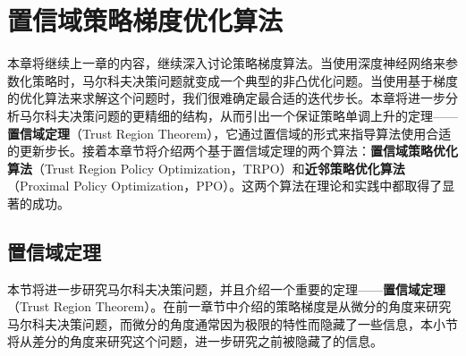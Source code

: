 \section{置信域策略梯度优化算法}

本章将继续上一章的内容，继续深入讨论策略梯度算法。当使用深度神经网络来参数化策略时，马尔科夫决策问题就变成一个典型的非凸优化问题。当使用基于梯度的优化算法来求解这个问题时，我们很难确定最合适的迭代步长。本章将进一步分析马尔科夫决策问题的更精细的结构，从而引出一个保证策略单调上升的定理——\textbf{置信域定理}\cite{kakade2002approximately}（Trust Region Theorem），它通过置信域的形式来指导算法使用合适的更新步长。接着本章节将介绍两个基于置信域定理的两个算法：\textbf{置信域策略优化算法}\cite{schulman2015trust}（Trust Region Policy Optimization，TRPO）和\textbf{近邻策略优化算法}\cite{schulman2017proximal}（Proximal Policy Optimization，PPO）。这两个算法在理论和实践中都取得了显著的成功。

\subsection{置信域定理}

本节将进一步研究马尔科夫决策问题，并且介绍一个重要的定理——\textbf{置信域定理}\cite{kakade2002approximately}（Trust Region Theorem）。在前一章节中介绍的策略梯度是从微分的角度来研究马尔科夫决策问题，而微分的角度通常因为极限的特性而隐藏了一些信息，本小节将从差分的角度来研究这个问题，进一步研究之前被隐藏了的信息。

